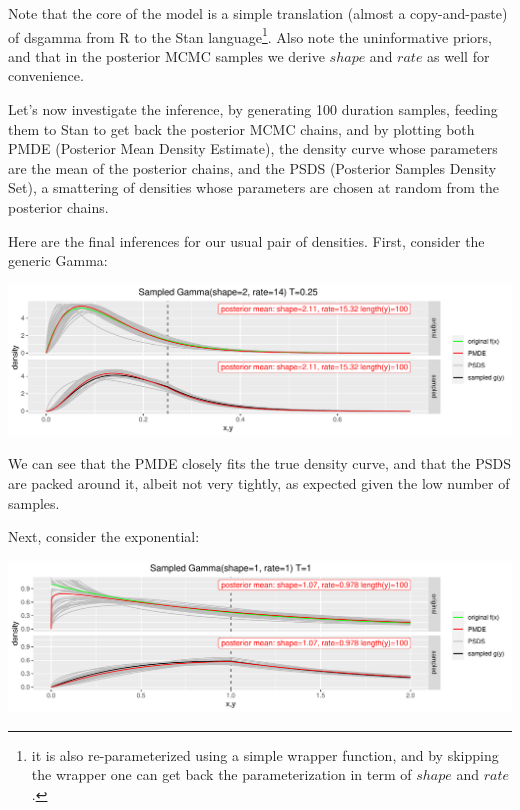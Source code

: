 \documentclass[]{article}
\begin{document}
Note that the core of the model is a simple translation (almost a
copy-and-paste) of dsgamma from R to the Stan language\footnote{it is
  also re-parameterized using a simple wrapper function, and by skipping
  the wrapper one can get back the parameterization in term of \(shape\)
  and \(rate\).}. Also note the uninformative priors, and that in the
posterior MCMC samples we derive \(shape\) and \(rate\) as well for
convenience.

Let's now investigate the inference, by generating 100 duration samples,
feeding them to Stan to get back the posterior MCMC chains, and by
plotting both PMDE (Posterior Mean Density Estimate), the density curve
whose parameters are the mean of the posterior chains, and the PSDS
(Posterior Samples Density Set), a smattering of densities whose
parameters are chosen at random from the posterior chains.

Here are the final inferences for our usual pair of densities. First,
consider the generic Gamma:

\begin{center}\includegraphics[width=1.0\textwidth]{sampling_event_duration_files/figure-latex/stan_inference_plot1-1} \end{center}

We can see that the PMDE closely fits the true density curve, and that
the PSDS are packed around it, albeit not very tightly, as expected
given the low number of samples.

Next, consider the exponential:

\begin{center}\includegraphics[width=1.0\textwidth]{sampling_event_duration_files/figure-latex/stan_inference_plot2-1} \end{center}
\end{document}
